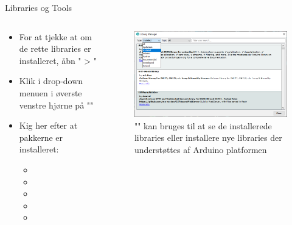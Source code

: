 \documentclass[aspectratio=169]{beamer}
\begin{document}
\begin{frame}{Libraries og Tools}
\begin{columns}
	\begin{column}{0.5\textwidth}
		\begin{textBox}
			\begin{itemize}
				\item For at tjekke at om de rette libraries er installeret, åbn " > "
				\item Klik i drop-down menuen i øverste venstre hjørne på ""
				\item Kig her efter at pakkerne er installeret:
				\begin{itemize}
					\item {}
					\item {}
					\item {}
					\item {}
					\item {}
				\end{itemize}
			\end{itemize}
		\end{textBox}
	\end{column}
	\begin{column}{0.5\textwidth}
		\begin{figure}
  			\includegraphics[width=\textwidth]{assets/pictures/librarymanager-installed.png}
  			\caption{"" kan bruges til at se de installerede libraries eller installere nye libraries der understøttes af Arduino platformen}
  			\label{fig:librarymanager-installed}
  		\end{figure}
	\end{column}
\end{columns}
\end{frame}
\end{document}
